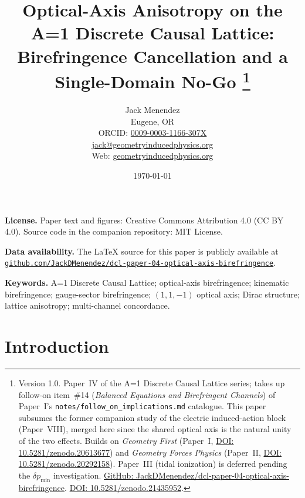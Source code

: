 \documentclass[12pt, letterpaper]{article}
\title{Optical-Axis Anisotropy on the A=1 Discrete Causal Lattice:\\
       Birefringence Cancellation and a Single-Domain No-Go%
       \thanks{Version 1.0.  Paper~IV of the A=1 Discrete Causal
       Lattice series; takes up follow-on item~\#14
       (\emph{Balanced Equations and Birefringent Channels}) of
       Paper~I's \texttt{notes/follow\_on\_implications.md} catalogue. This
       paper subsumes the former companion study of the electric induced-action
       block (Paper~VIII), merged here since the shared optical axis is the
       natural unity of the two effects.
       Builds on \emph{Geometry First}
       (Paper~I,
       \href{https://doi.org/10.5281/zenodo.20613677}{DOI:
       10.5281/zenodo.20613677}) and \emph{Geometry Forces Physics}
       (Paper~II,
       \href{https://doi.org/10.5281/zenodo.20292158}{DOI:
       10.5281/zenodo.20292158}).
       Paper~III (tidal ionization) is deferred pending the
       $\delta p_\text{min}$ investigation.
       \href{https://github.com/JackDMenendez/dcl-paper-04-optical-axis-birefringence}%
            {GitHub: JackDMenendez/dcl-paper-04-optical-axis-birefringence}.
       \href{https://doi.org/10.5281/zenodo.21435952}{DOI:
            10.5281/zenodo.21435952}.}}
\author{Jack Menendez\\
        \small Eugene, OR\\
        \small ORCID: \href{https://orcid.org/0009-0003-1166-307X}{0009-0003-1166-307X}\\
        \small \href{mailto:jack@geometryinducedphysics.org}{jack@geometryinducedphysics.org}\\
        \small Web: \href{https://geometryinducedphysics.org/}{geometryinducedphysics.org}}
\date{\today}
\begin{document}
\maketitle

\noindent\textbf{License.}  Paper text and figures: Creative Commons
Attribution 4.0 (CC BY 4.0).  Source code in the companion
repository: MIT License.

\medskip
\noindent\textbf{Data availability.}  The LaTeX source for this paper
is publicly available at
\href{https://github.com/JackDMenendez/dcl-paper-04-optical-axis-birefringence}%
     {\nolinkurl{github.com/JackDMenendez/dcl-paper-04-optical-axis-birefringence}}.

\medskip
\noindent\textbf{Keywords.}  A=1 Discrete Causal Lattice; optical-axis
birefringence; kinematic birefringence; gauge-sector birefringence;
$(1,1,-1)$ optical axis; Dirac structure; lattice anisotropy;
multi-channel concordance.

\newpage

\begin{abstract}
    
\end{abstract}



\newpage
\tableofcontents
\newpage

\section{Introduction}

\end{document}
